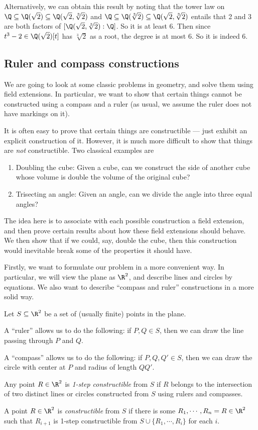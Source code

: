 \documentclass[a4paper]{article}
\begin{document}
\begin{eg}
  Alternatively, we can obtain this result by noting that the tower law on $\Q \subseteq \Q(\sqrt{2})\subseteq \Q(\sqrt{2}, \sqrt[3]{2})$ and $\Q\subseteq \Q(\sqrt[3]{2}) \subseteq \Q(\sqrt{2}, \sqrt[3]{2})$ entails that 2 and 3 are both factors of $[\Q(\sqrt{2}, \sqrt[3]{2}):\Q]$. So it is at least $6$. Then since $t^3 - 2\in \Q(\sqrt{2})[t]$ has $\sqrt[3]{2}$ as a root, the degree is at most 6. So it is indeed 6.
\end{eg}
\subsection{Ruler and compass constructions}
We are going to look at some classic problems in geometry, and solve them using field extensions. In particular, we want to show that certain things cannot be constructed using a compass and a ruler (as usual, we assume the ruler does not have markings on it).

It is often easy to prove that certain things are constructible --- just exhibit an explicit construction of it. However, it is much more difficult to show that things are \emph{not} constructible. Two classical examples are
\begin{enumerate}
  \item Doubling the cube: Given a cube, can we construct the side of another cube whose volume is double the volume of the original cube?
  \item Trisecting an angle: Given an angle, can we divide the angle into three equal angles?
\end{enumerate}
The idea here is to associate with each possible construction a field extension, and then prove certain results about how these field extensions should behave. We then show that if we could, say, double the cube, then this construction would inevitable break some of the properties it should have.

Firstly, we want to formulate our problem in a more convenient way. In particular, we will view the plane as $\R^2$, and describe lines and circles by equations. We also want to describe ``compass and ruler'' constructions in a more solid way.
\begin{defi}
  Let $S\subseteq \R^2$ be a set of (usually finite) points in the plane.

  A ``ruler'' allows us to do the following: if $P, Q\in S$, then we can draw the line passing through $P$ and $Q$.

  A ``compass'' allows us to do the following: if $P, Q, Q'\in S$, then we can draw the circle with center at $P$ and radius of length $QQ'$.

  Any point $R\in \R^2$ is \emph{1-step constructible} from $S$ if $R$ belongs to the intersection of two distinct lines or circles constructed from $S$ using rulers and compasses.

  A point $R\in \R^2$ is \emph{constructible} from $S$ if there is some $R_1, \cdots, R_n = R \in \R^2$ such that $R_{i + 1}$ is 1-step constructible from $S\cup \{R_1, \cdots, R_i\}$ for each $i$.
\end{defi}
\end{document}
